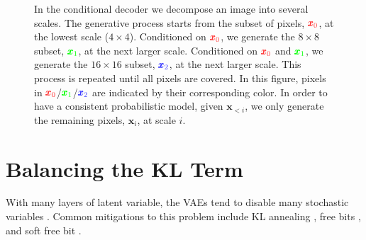\documentclass{article}
\newcommand{\x}{{\pmb{x}}}
\begin{document}
\begin{figure}
\centering
{}
\caption{In the conditional decoder we decompose an image into several scales. The generative process starts from the subset of pixels, $\color{red!80}\x_0$, at the lowest scale ($4\times4$). Conditioned on $\color{red!80}\x_0$, we generate the $8\times 8$ subset, $\color{green!100}\x_1$, at the next larger scale. Conditioned on $\color{red!80}\x_0$ and $\color{green!100}\x_1$, we generate the $16\times16$ subset, $\color{blue!80}\x_2$, at the next larger scale. This process is repeated until all pixels are covered. In this figure, pixels in $\color{red!80}\x_0$/$\color{green!100}\x_1$/$\color{blue!80}\x_2$ are indicated by their corresponding color. In order to have a consistent probabilistic model, given $\x_{<i}$, we only generate the remaining pixels, $\x_i$, at scale $i$.}
\label{fig:multi-scale}
\end{figure}

\section{Balancing the KL Term} \label{app:KLBalance}

With many layers of latent variable, the VAEs tend to disable many stochastic variables \cite{bowman2016generating, sonderby2016ladder}. Common mitigations
to this problem include KL annealing \cite{sonderby2016ladder}, free bits \cite{kingma2016improved}, and soft free bit \cite{chen2016variational}. 
\end{document}
